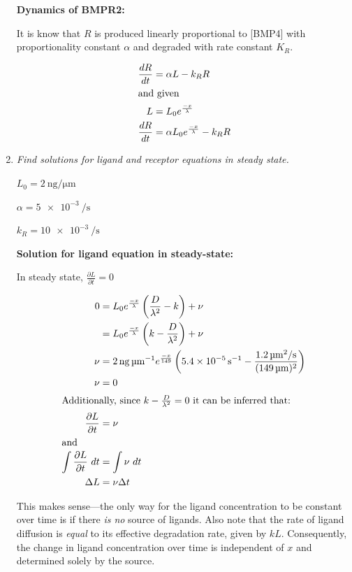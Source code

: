 \documentclass{article} %
\begin{document}
\begin{enumerate}
  \textbf{Dynamics of BMPR2:}

  It is know that $R$ is produced linearly proportional to [BMP4] with proportionality constant $\alpha$ and degraded with rate constant $K_R$.

  \begin{align*}
    \frac{dR}{dt} &= \alpha L-k_R R \\
    \intertext{and given}
    L &= L_0 e^{\frac{-x}{\lambda}} \\
    \frac{dR}{dt} &= \alpha L_0 e^{\frac{-x}{\lambda}} -k_R R \\
  \end{align*}

\item \textit{Find solutions for ligand and receptor equations in steady state.}

  $L_0=\SI{2}{\nano\g\per\micro\m}$

  $\alpha = \SI{5e-3}{\per\s}$

  $k_R= \SI{10e-3}{\per\s}$


  \textbf{Solution for ligand equation in steady-state:}

  In steady state, $\frac{\partial L}{\partial t} = 0$  

  \begin{align*}
    0 &= L_0e^{\frac{-x}{\lambda}}\left(\frac{D}{\lambda^2} -k \right) + \nu \\
      &= L_0e^{\frac{-x}{\lambda}}\left(k - \frac{D}{\lambda^2} \right) + \nu \\
    \nu &= \SI{2}{\nano\g\per\micro\m}e^{\frac{-x}{149}} \left (\SI{5.4e-5}{\per\s} - \frac{\SI{1.2}{\micro\m^2\per\s}}{(\SI{149}{\micro\m})^2} \right ) \\
    \nu &= 0 \\
    \intertext{Additionally, since $k - \frac{D}{\lambda^2}=0$ it can be inferred that:}
    \frac{\partial L}{\partial t} &= \nu \\
    \intertext{and}
    \int \frac{\partial L}{\partial t}~dt&=\int \nu~dt \\ 
    \Delta L &= \nu \Delta t
  \end{align*}

  This makes sense---the only way for the ligand concentration to be constant over time is if there \emph{is no} source of ligands. Also note that the rate of ligand diffusion is \emph{equal} to its effective degradation rate, given by $kL$. Consequently, the change in ligand concentration over time is independent of $x$ and determined solely by the source.
  


\end{enumerate}
\end{document}
